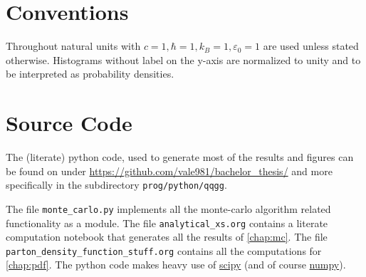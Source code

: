 \section{Conventions}%
\label{sec:convent}

Throughout natural units with \(c=1, \hbar = 1, k_B=1, \varepsilon_0
= 1\) are used unless stated otherwise. Histograms without label on
the y-axis are normalized to unity and to be interpreted as
probability densities.

\section{Source Code}%
\label{sec:source}

The (literate) python code, used to generate most of the results and
figures can be found on under
\url{https://github.com/vale981/bachelor_thesis/} and more
specifically in the subdirectory \texttt{prog/python/qqgg}.

The file \texttt{monte\_carlo.py} implements all the monte-carlo
algorithm related functionality as a module. The file
\texttt{analytical\_xs.org} contains a literate computation notebook
that generates all the results of \cref{chap:mc}. The file
\texttt{parton\_density\_function\_stuff.org} contains all the
computations for \cref{chap:pdf}. The python code makes heavy use of
\href{https://www.scipy.org/}{scipy} (and of course
\href{https://numpy.org/}{numpy}).

